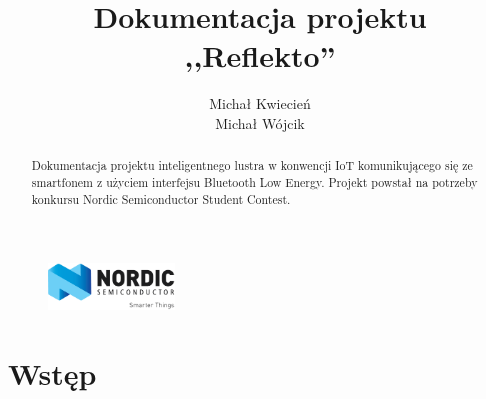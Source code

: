 \documentclass[a4paper,11pt]{article}
\begin{document}
\title{Dokumentacja projektu \\ \textbf{,,Reflekto'' } }
\author{Michał Kwiecień \\ Michał Wójcik}
\maketitle

\begin{abstract}
Dokumentacja projektu inteligentnego lustra w konwencji IoT komunikującego się ze smartfonem z użyciem interfejsu Bluetooth Low Energy. Projekt powstał na potrzeby konkursu Nordic Semiconductor Student Contest. 
\end{abstract}

\begin{figure}
	\includegraphics[width=0.3\textwidth,center]{logo_nordic.png}
\end{figure}

\cleardoublepage
\tableofcontents
\clearpage

\section{Wstęp}



	
\end{document}
